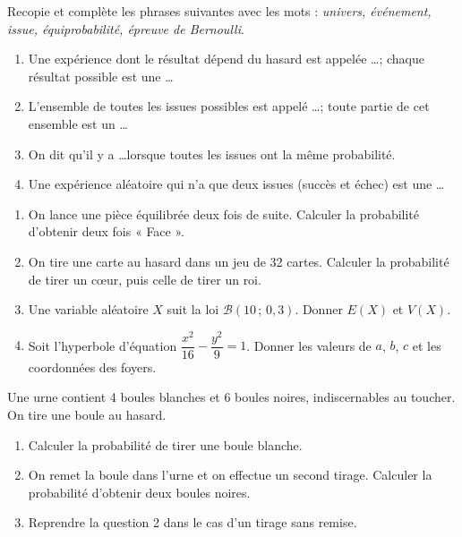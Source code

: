 \documentclass[11pt]{article}
\newcounter{popsec}
\newcounter{popsub}
\newcommand{\courssub}[1]{%
  \stepcounter{popsub}%
  \par\vspace{9pt}\noindent{\popxbold\fontsize{11.5}{13}\selectfont\color{popink}{\color{poporange}\thepopsec.\thepopsub}\hspace{6pt}#1}\par\nopagebreak\vspace{4pt}
}
\begin{document}
\begin{exercice}
Recopie et complète les phrases suivantes avec les mots : \emph{univers, événement, issue, équiprobabilité, épreuve de Bernoulli}.
\begin{enumerate}
\item Une expérience dont le résultat dépend du hasard est appelée \ldots ; chaque résultat possible est une \ldots
\item L'ensemble de toutes les issues possibles est appelé \ldots ; toute partie de cet ensemble est un \ldots
\item On dit qu'il y a \ldots lorsque toutes les issues ont la même probabilité.
\item Une expérience aléatoire qui n'a que deux issues (succès et échec) est une \ldots
\end{enumerate}
\end{exercice}

\begin{exercice}
\begin{enumerate}
\item On lance une pièce équilibrée deux fois de suite. Calculer la probabilité d'obtenir deux fois « Face ».
\item On tire une carte au hasard dans un jeu de 32 cartes. Calculer la probabilité de tirer un cœur, puis celle de tirer un roi.
\item Une variable aléatoire $X$ suit la loi $\mathcal{B}(10\,;\,0,3)$. Donner $E(X)$ et $V(X)$.
\item Soit l'hyperbole d'équation $\dfrac{x^2}{16}-\dfrac{y^2}{9}=1$. Donner les valeurs de $a$, $b$, $c$ et les coordonnées des foyers.
\end{enumerate}
\end{exercice}

\courssub{Je m'entraîne}

\begin{exercice}
Une urne contient 4 boules blanches et 6 boules noires, indiscernables au toucher. On tire une boule au hasard.
\begin{enumerate}
\item Calculer la probabilité de tirer une boule blanche.
\item On remet la boule dans l'urne et on effectue un second tirage. Calculer la probabilité d'obtenir deux boules noires.
\item Reprendre la question 2 dans le cas d'un tirage sans remise.
\end{enumerate}
\end{exercice}
\end{document}
